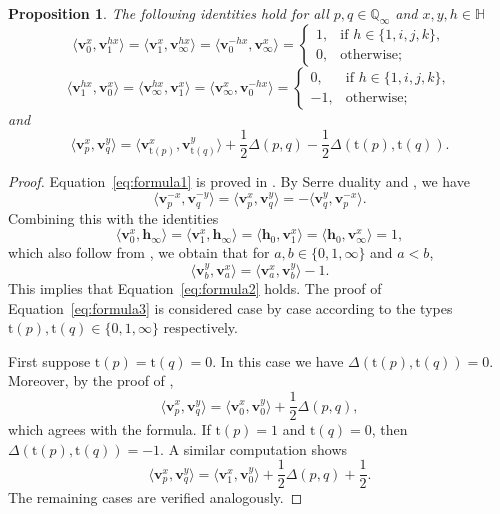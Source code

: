 \documentclass[11pt,a4paper,reqno]{amsart}%
\theoremstyle{plain}
\newtheorem{proposition}[proposition]{Proposition}
\theoremstyle{definition}
\numberwithin{equation}{section}
\numberwithin{equation}{section}
\def\<{\langle}
\def\>{\rangle}
\newcommand{\QQi}{\mathbb{Q}_\infty}
\newcommand{\bv}{\mathbf{v}}
\newcommand{\bh}{\mathbf{h}}
\newcommand{\typ}[1]{\mathrm{t}(#1)}%
\newcommand{\bfH}{\mathbb{H}}
\begin{document}
 \begin{proposition}\label{hom dim} The following identities  hold for all 
  $p, q\in\QQi$ and $x,y,h\in\bfH$
 \begin{equation}
    \label{eq:formula1}
     \<\bv_0^x,\bv_1^{hx}\>=
   \<\bv_1^x,\bv_\infty^{hx}\>=
    \<\bv_0^{-hx}, \bv_\infty^{x}\>=
      \begin{cases}
        1,&\text{if $h\in \{1,i,j,k\}$},\\
        0,&\text{otherwise};
      \end{cases}
  \end{equation}   
   \begin{equation}
    \label{eq:formula2}
     \<\bv_1^{hx},\bv_0^x\>=
   \<\bv_\infty^{hx},\bv_1^x\>=
    \<\bv_\infty^{x},\bv_0^{-hx}\>=
      \begin{cases}
        0,&\text{if $h\in \{1,i,j,k\}$},\\
        -1,&\text{otherwise};
      \end{cases}
  \end{equation}
and 
   \begin{equation}
    \label{eq:formula3}
    \langle \bv_{p}^x, \bv_{q}^y\rangle
=\langle \bv_{\typ{p}}^x, \bv_{\typ{q}}^y\rangle+\frac{1}{2}\Delta(p,q)-\frac{1}{2}\Delta(\typ{p},\typ{q}).
\end{equation}
\end{proposition}
\begin{proof} 
Equation~\eqref{eq:formula1}   is proved in \cite[Lemma 4.1]{BG}.
By Serre duality  and \cite[Lemma~2.8 and Proposition~2.9]{BG}, we have
 \[
  \<\bv_p^{-x},\bv_q^{-y}\>=\<\bv_p^x,\bv_q^y\>=-\<\bv_q^y,\bv_p^{-x}  \>.
 \]
   Combining this with the identities 
$$\<\bv_0^x,\bh_\infty\>=\<\bv_1^x,\bh_\infty\>=
\< \bh_0,\bv_1^x\>=\<\bh_0,\bv_\infty^x\>=1,$$  which also follow from \cite[Lemma 4.1]{BG}, we obtain that for  $a,b\in\{0,1,\infty\}$ and $a<b$,
\[
\<\bv_b^y,\bv_a^x\>=\<\bv_a^x,\bv_b^y\>-1.
\]
  This implies that Equation~\eqref{eq:formula2} holds.
The proof of Equation~\eqref{eq:formula3}  is considered case by case according to  the types $\typ{p},\typ{q}\in\{0,1,\infty\}$ respectively.

First suppose $\typ{p}=\typ{q}=0$. In this case we have $\Delta(\typ{p},\typ{q})=0$. Moreover, by  the proof of  \cite[Proposition 4.7]{BG},
$$\langle \bv_{p}^x, \bv_{q}^y\rangle=\langle \bv_{0}^x, \bv_{0}^y\rangle  +\frac{1}{2}\Delta(p,q),
$$
which agrees with the formula.
If $\typ{p}=1$ and $\typ{q}=0$, then  $\Delta(\typ{p},\typ{q})=-1$. A similar computation shows
$$\langle \bv_{p}^x, \bv_{q}^y\rangle=\langle \bv_{1}^x, \bv_{0}^y\rangle   +\frac{1}{2}\Delta(p,q)+\frac{1}{2}.
$$   The remaining cases are verified analogously.
\end{proof}
\end{document}
